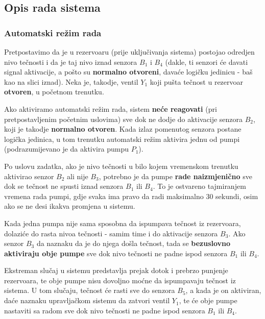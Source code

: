 \documentclass[12pt, titlepage]{article}
\begin{document}

        \subsection{Opis rada sistema}

            \subsubsection{Automatski režim rada}

                Pretpostavimo da je u rezervoaru (prije uključivanja sistema) postojao odredjen nivo 
                tečnosti i da je taj nivo iznad senzora $B_1$ i $B_4$ (dakle, ti senzori
                će davati signal aktivacije, a pošto su \textbf{normalno otvoreni}, davaće logičku jedinicu -
                baš kao na slici iznad).
                Neka je, takodje, ventil $Y_1$ koji pušta tečnost u rezervoar \textbf{otvoren}, u početnom trenutku.

                Ako aktiviramo automatski režim rada, sistem \textbf{neće reagovati} (pri pretpostavljenim početnim uslovima)
                sve dok ne dodje do aktivacije senzora $B_2$, koji je takodje \textbf{normalno otvoren}. 
                Kada izlaz pomenutog senzora postane logička jedinica, u tom trenutku automatski režim aktivira jednu od pumpi
                (podrazumijevano je da aktivira pumpu $P_1$). 

                Po uslovu zadatka, ako je nivo tečnosti u bilo kojem vremenskom trenutku aktivirao senzor $B_2$ ali nije
                $B_3$, potrebno je da pumpe \textbf{rade naizmjenično} sve dok se tečnost ne spusti iznad senzora $B_1$ ili $B_4$.
                To je ostvareno tajmiranjem vremena rada pumpi, gdje svaka ima pravo da radi maksimalno $30$ sekundi,
                osim ako se ne desi ikakva promjena u sistemu.

                Kada jedna pumpa nije sama sposobna da ispumpava tečnost iz rezervoara, dolaziće do rasta nivoa 
                tečnosti - samim time i do aktivacije senzora $B_3$. Ako senzor $B_3$ da naznaku da je do njega došla tečnost,
                tada se \textbf{bezuslovno aktiviraju obje pumpe} sve dok nivo tečnosti ne padne ispod senzora $B_1$ ili $B_4$.

                Ekstreman slučaj u sistemu predstavlja prejak dotok i prebrzo punjenje rezervoara, te obje pumpe
                nisu dovoljno moćne da ispumpavaju tečnost iz sistema. U tom slučaju, tečnost će rasti sve do senzora 
                $B_5$, a kada je on aktiviran, daće naznaku upravljačkom sistemu da zatvori ventil $Y_1$, te 
                će obje pumpe nastaviti sa radom sve dok nivo tečnosti ne padne ispod senzora $B_1$ ili $B_4$.
\end{document}
